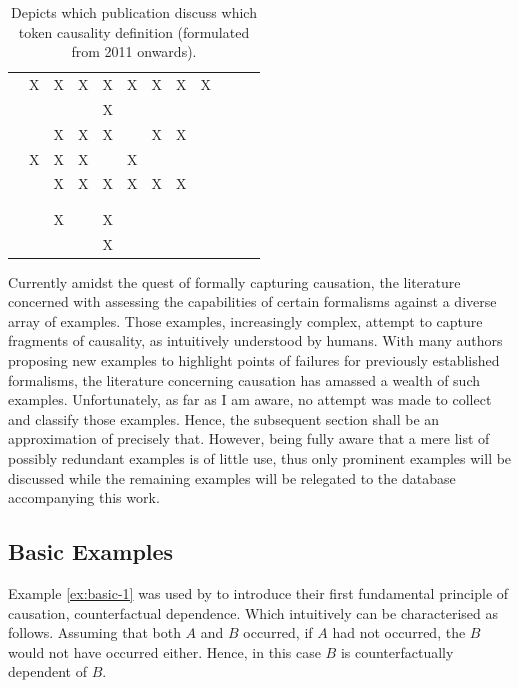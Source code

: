 \documentclass[11pt,a4paper]{book}
\theoremstyle{definition}
\theoremstyle{definition}
\theoremstyle{definition}
\theoremstyle{remark}
\begin{document}
\begin{table}
\begin{tabular}{lp{1.25cm}p{1.25cm}p{1.25cm}p{1.15cm}p{1.25cm}p{1.25cm}p{1.25cm}p{1.25cm}p{1.25cm}p{1.25cm}p{1.25cm}}
 \cite{beckers2018principled} 	& X	& X	& X	& X	& X	& X	& X	& X	 \\ 
 \cite{bochman2018laws}  	& 	& 	& 	& X	& 	& 	& 	& 	 \\ 
 \cite{denecker2018causal}  	& 	& X	& X	& X	& 	& X	& X	& 	 \\ 
 \cite{batusov2018situation}  	& X	& X	& X	& 	& X	& 	& 	& 	 \\ 
 \cite{denecker2019explaining}  	& 	& X	& X	& X	& X	& X	& X	& 	 \\ 
 \cite{liepicna2019evaluation}  	& 	& 	& 	& 	& 	& 	& 	& 	 \\ 
 \cite{leblanc2019explaining} 	& 	& 	& 	& 	& 	& 	& 	& 	 \\ 
 \cite{liepicna2020arguing} 	& 	& X	& 	& X	& 	& 	& 	& 	 \\ 
 \cite{khannecessary}  	& 	& 	& 	& X	& 	& 	& 	& 	 \\ 
	 	 	 	 	 	 	 	 	


\bottomrule
\end{tabular}
\caption{Depicts which publication discuss which token causality definition (formulated from 2011 onwards).  }
\label{tab:language}
\end{table}




Currently amidst the quest of formally capturing causation, the literature concerned with assessing the capabilities of certain formalisms against a diverse array of examples.
Those examples, increasingly complex, attempt to capture fragments of causality, as intuitively understood by humans. With many authors proposing new examples to highlight points of failures for previously established formalisms, the literature concerning causation has amassed a wealth of such examples. Unfortunately, as far as I am aware, no attempt was made to collect and classify those examples. Hence, the subsequent section shall be an approximation of precisely that. However, being fully aware that a mere list of possibly redundant examples is of little use, thus only prominent examples will be discussed while the remaining examples will be relegated to the database accompanying this work.



\subsection{Basic Examples}


Example \ref{ex:basic-1} was used by \parencite{beckers2018principled} to introduce their first fundamental principle of causation, counterfactual dependence.
Which intuitively can be characterised as follows. Assuming that both $A$ and $B$ occurred, if $A$ had not occurred, the $B$ would not have occurred either. 
Hence, in this case $B$ is counterfactually dependent of $B$.
\end{document}
